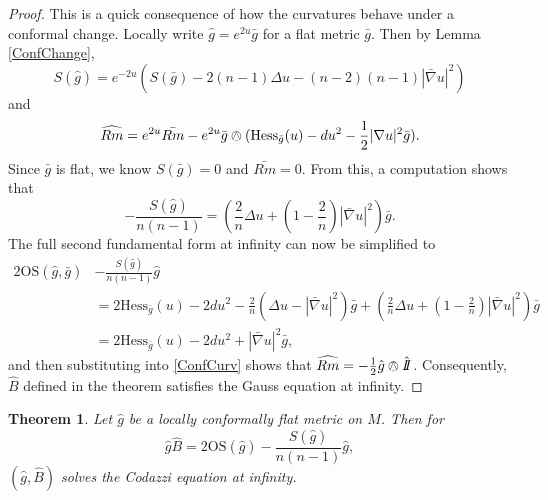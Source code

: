 \documentclass{amsart}
\newcommand{\two}{I\!\!I}
\newtheorem{thm}{Theorem}[section]
\begin{document}
\begin{proof}
This is a quick consequence of how the curvatures behave under a conformal change.
Locally write $\hat{g} = e^{2u}\bar{g}$ for a flat metric $\bar{g}$. Then by Lemma \ref{ConfChange},
\[
S(\hat{g}) = e^{-2u}(S(\bar{g}) -2(n-1)\Delta u  - (n-2)(n-1)|\bar{\nabla}u|^2)
\]
and
\begin{equation}
\label{ConfCurv}
\widehat{Rm} = e^{2u}\bar{Rm} - e^{2u}\bar{g}\owedge(\mathrm{Hess}_{\bar{g}}(u) - du^2 - \frac{1}{2}|\nabla u|^2\bar{g}).
\end{equation}
Since $\bar{g}$ is flat, we know $S(\bar{g}) = 0$ and $\bar{Rm} = 0$.
From this, a computation shows that
\[
-\frac{S(\hat{g})}{n(n-1)} = \left( \frac{2}{n}\Delta u + \left(1 - \frac{2}{n}\right)|\bar{\nabla}u|^2 \right)\bar{g}.
\]
The full second fundamental form at infinity can now be simplified to 
\begin{align}
2\mathrm{OS}(\hat{g},\bar{g}) &- \frac{S(\hat{g})}{n(n-1)}\hat{g} \nonumber \\
&= 2\mathrm{Hess}_{\bar{g}}(u) - 2du^2 - \frac{2}{n}\left(\Delta u - |\bar{\nabla}u|^2\right)\bar{g} + \left( \frac{2}{n}\Delta u + \left(1 - \frac{2}{n}\right)|\bar{\nabla}u|^2 \right)\bar{g} \nonumber \\
&= 2\mathrm{Hess}_{\bar{g}}(u) - 2 du^2 + |\bar{\nabla}u|^2 \bar{g}, \label{OSu}
\end{align}
and then substituting into \eqref{ConfCurv} shows that $\widehat{Rm} = -\frac{1}{2}\hat{g}\owedge \hat{\two}$.
Consequently, $\hat{B}$ defined in the theorem satisfies the Gauss equation at infinity.
\end{proof}

\begin{thm}
\label{MainThmCodazzi}
Let $\hat{g}$ be a locally conformally flat metric on $M$. Then for 
\[
\hat{g} \hat{B} = 2\mathrm{OS}(\hat{g}) - \frac{S(\hat{g})}{n(n-1)}\hat{g},
\]
$(\hat{g},\hat{B})$ solves the Codazzi equation at infinity.
\end{thm}
\end{document}
